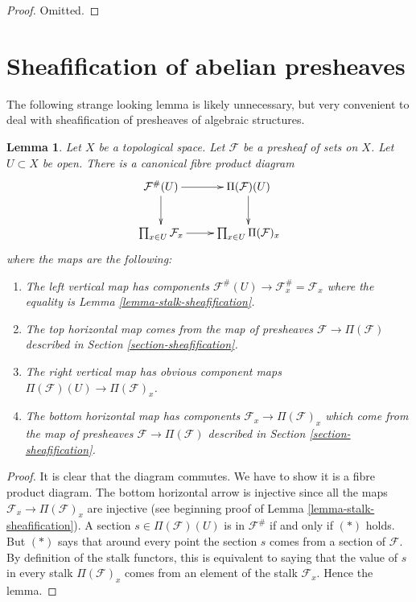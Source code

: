 \documentclass{stacks-project}
\theoremstyle{plain}
\newtheorem{lemma}[subsection]{Lemma}
\theoremstyle{definition}
\theoremstyle{remark}
\numberwithin{equation}{subsection}
\begin{document}
\begin{proof}
Omitted.
\end{proof}


\section{Sheafification of abelian presheaves}
\label{section-sheafify-abelian-presheaves}

\noindent
The following strange looking lemma is likely unnecessary, but
very convenient to deal with sheafification of presheaves
of algebraic structures.

\begin{lemma}
\label{lemma-diagram-fibre-product}
Let $X$ be a topological space. Let $\mathcal{F}$ be
a presheaf of sets on $X$. Let $U \subset X$ be open.
There is a canonical fibre product diagram
$$
\xymatrix{
\mathcal{F}^\#(U) \ar[d] \ar[r] &
\Pi(\mathcal{F})(U) \ar[d] \\
\prod_{x \in U} \mathcal{F}_x
\ar[r] &
\prod_{x \in U} \Pi(\mathcal{F})_x
}
$$
where the maps are the following:
\begin{enumerate}
\item The left vertical map has components
$\mathcal{F}^\#(U) \to \mathcal{F}^\#_x = \mathcal{F}_x$
where the equality is Lemma \ref{lemma-stalk-sheafification}.
\item The top horizontal map comes from the
map of presheaves $\mathcal{F} \to \Pi(\mathcal{F})$ described
in Section \ref{section-sheafification}.
\item The right vertical map has obvious component
maps $\Pi(\mathcal{F})(U) \to \Pi(\mathcal{F})_x$.
\item The bottom horizontal map has components
$\mathcal{F}_x \to \Pi(\mathcal{F})_x$
which come from the map of presheaves
$\mathcal{F} \to \Pi(\mathcal{F})$ described
in Section \ref{section-sheafification}.
\end{enumerate}
\end{lemma}

\begin{proof}
It is clear that the diagram commutes. We have to show
it is a fibre product diagram. The bottom horizontal arrow
is injective since all the maps $\mathcal{F}_x \to \Pi(\mathcal{F})_x$
are injective (see beginning proof of
Lemma \ref{lemma-stalk-sheafification}).
A section $s \in \Pi(\mathcal{F})(U)$ is in $\mathcal{F}^\#$ if and
only if $(*)$ holds. But $(*)$ says that around every point
the section $s$ comes from a section of $\mathcal{F}$. By definition
of the stalk functors, this is equivalent to saying that
the value of $s$ in every stalk $\Pi(\mathcal{F})_x$ comes
from an element of the stalk $\mathcal{F}_x$. Hence the lemma.
\end{proof}
\end{document}
